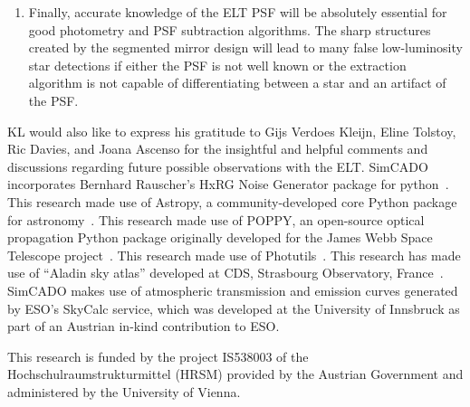 \documentclass{aa}
\begin{document}
\begin{enumerate}
    \item Finally, accurate knowledge of the ELT PSF will be absolutely essential for good photometry and PSF subtraction algorithms.
    The sharp structures created by the segmented mirror design will lead to many false low-luminosity star detections if either the PSF is not well known or the extraction algorithm is not capable of differentiating between a star and an artifact of the PSF\@.

\end{enumerate}






\begin{acknowledgements}

KL would also like to express his gratitude to Gijs Verdoes Kleijn, Eline Tolstoy, Ric Davies, and Joana Ascenso for the insightful and helpful comments and discussions regarding future possible observations with the ELT\@.
SimCADO incorporates Bernhard Rauscher's HxRG Noise Generator package for python~\citep{nghxrg}.
This research made use of Astropy, a community-developed core Python package for astronomy~\citep{astropy, astropy2}.
This research made use of POPPY, an open-source optical propagation Python package originally developed for the James Webb Space Telescope project~\citep{poppy}.
This research made use of Photutils~\citep{photutils}.
This research has made use of ``Aladin sky atlas'' developed at CDS, Strasbourg Observatory, France~\citep{aladin, aladinlite}.
SimCADO makes use of atmospheric transmission and emission curves generated by ESO's SkyCalc service, which was developed at the University of Innsbruck as part of an Austrian in-kind contribution to ESO\@.

This research is funded by the project IS538003 of the Hochschulraumstrukturmittel (HRSM) provided by the Austrian Government and administered by the University of Vienna.

\end{acknowledgements}





\end{document}
